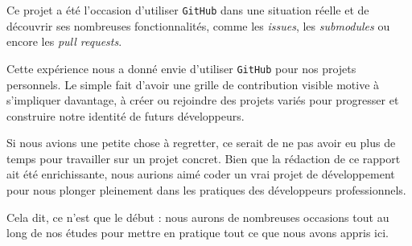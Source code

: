 Ce projet a été l’occasion d’utiliser \texttt{GitHub} dans une situation réelle et de découvrir ses nombreuses fonctionnalités, comme les \textit{issues}, les \textit{submodules} ou encore les \textit{pull requests}.

Cette expérience nous a donné envie d’utiliser \texttt{GitHub} pour nos projets personnels. Le simple fait d’avoir une grille de contribution visible motive à s’impliquer davantage, à créer ou rejoindre des projets variés pour progresser et construire notre identité de futurs développeurs.

Si nous avions une petite chose à regretter, ce serait de ne pas avoir eu plus de temps pour travailler sur un projet concret. Bien que la rédaction de ce rapport ait été enrichissante, nous aurions aimé coder un vrai projet de développement pour nous plonger pleinement dans les pratiques des développeurs professionnels.

Cela dit, ce n’est que le début : nous aurons de nombreuses occasions tout au long de nos études pour mettre en pratique tout ce que nous avons appris ici.